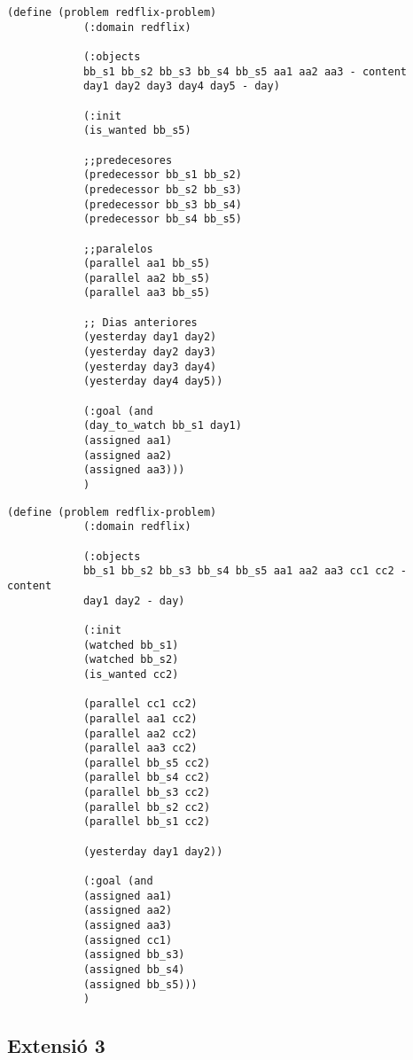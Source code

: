\documentclass[a4paper]{article}
\begin{document}
	
	\noindent
	\begin{minipage}[t]{0.45\textwidth}
		\begin{lstlisting}[language=PDDL, caption={Joc de Prova 1 - Extensió 2}, label={lst:JP12}]                     
			(define (problem redflix-problem)
			(:domain redflix)
			
			(:objects
			bb_s1 bb_s2 bb_s3 bb_s4 bb_s5 aa1 aa2 aa3 - content
			day1 day2 day3 day4 day5 - day)
			
			(:init
			(is_wanted bb_s5)
			
			;;predecesores
			(predecessor bb_s1 bb_s2)
			(predecessor bb_s2 bb_s3)
			(predecessor bb_s3 bb_s4)
			(predecessor bb_s4 bb_s5)
			
			;;paralelos
			(parallel aa1 bb_s5)
			(parallel aa2 bb_s5)
			(parallel aa3 bb_s5)
			
			;; Dias anteriores
			(yesterday day1 day2)
			(yesterday day2 day3)
			(yesterday day3 day4)
			(yesterday day4 day5))
			
			(:goal (and
			(day_to_watch bb_s1 day1)
			(assigned aa1)
			(assigned aa2)
			(assigned aa3)))
			)
		\end{lstlisting}
		
	\end{minipage}
	\hfill
	\begin{minipage}[t]{0.45\textwidth}
		\begin{lstlisting}[language=PDDL, caption={Joc de Prova 2 - Extensió 2}, label={lst:JP22}]                     
			(define (problem redflix-problem)
			(:domain redflix)
			
			(:objects
			bb_s1 bb_s2 bb_s3 bb_s4 bb_s5 aa1 aa2 aa3 cc1 cc2 - content
			day1 day2 - day)
			
			(:init
			(watched bb_s1)
			(watched bb_s2)
			(is_wanted cc2)
			
			(parallel cc1 cc2)
			(parallel aa1 cc2)
			(parallel aa2 cc2)
			(parallel aa3 cc2)
			(parallel bb_s5 cc2)
			(parallel bb_s4 cc2)
			(parallel bb_s3 cc2)
			(parallel bb_s2 cc2)
			(parallel bb_s1 cc2)
			
			(yesterday day1 day2))
			
			(:goal (and
			(assigned aa1)
			(assigned aa2)
			(assigned aa3)
			(assigned cc1)
			(assigned bb_s3)
			(assigned bb_s4)
			(assigned bb_s5)))
			)
		\end{lstlisting}
	\end{minipage}
	
	
	\subsection{Extensió 3}
	
\end{document}
